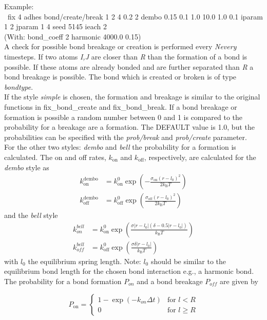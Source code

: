 \documentclass[a4paper,10pt]{scrreprt}
\begin{document}
Example:\\[0.5ex]
\
fix             4 adhes bond/create/break 1 2 4 0.2 2 dembo 0.15 0.1 1.0 10.0 1.0 0.1 iparam 1 2 jparam 1 4 seed 5145 ieach 2\\
(With: bond\_coeff      2 harmonic 4000.0 0.15)
\\[3ex]
A check for possible bond breakage or creation is performed every \textit{Nevery} timesteps. 
If two atoms \textit{I,J} are closer than \textit{R} than the formation of a bond is possible.
If these atoms are already bonded and are further separated than \textit{R} a bond breakage is possible.
The bond which is created or broken is of type \textit{bondtype}.
\\[2ex]
If the style \textit{simple} is chosen, the formation and breakage is similar to the original functions in fix\_bond\_create and fix\_bond\_break.
If a bond breakage or formation is possible a random number between 0 and 1 is compared to the probability for a breakage are a formation.
The DEFAULT value is 1.0, but the probabilities can be specified with the \textit{prob/break} and \textit{prob/create} parameter.
\\[2ex]
For the other two styles: \textit{dembo} and \textit{bell} the probability for a formation is calculated.
The on and off rates, $k_\mathrm{on}$ and $k_\mathrm{off}$, respectively, are calculated for the \textit{dembo} style as
\begin{align}
	k_\mathrm{on}^\mathrm{dembo} &= k_\mathrm{on}^0 \exp\left( -\frac{\sigma_\mathrm{on} (r - l_0)^2}{2 k_\mathrm{B} T}  \right)\\
  k_\mathrm{off}^\mathrm{dembo} &= k_\mathrm{off}^0 \exp\left( \frac{\sigma_\mathrm{off} (r - l_0)^2}{2 k_\mathrm{B} T}  \right)
\end{align}
and the \textit{bell} style
\begin{align}
	k_{on}^{bell} &= k_\mathrm{on}^0 \exp\left( \frac{ \sigma |r - l_0|(\delta - 0.5|r - l_0|) }{ k_\mathrm{B} T}  \right)\\
  k_{off}^{bell} &= k_\mathrm{off}^0 \exp\left( \frac{\sigma \delta |r - l_0|}{k_\mathrm{B} T}  \right)
\end{align}
with $l_0$ the equilibrium spring length.
Note: $l_0$ should be similar to the equilibrium bond length for the chosen bond interaction e.g., a harmonic bond.
\\[2ex]
The probability for a bond formation $P_{on}$ and a bond breakage $P_{off}$ are given by

\begin{equation}
P_\mathrm{on}  = 
\begin{cases}

1 - \exp(-k_{on}\Delta t) & \text{for } l < R\\
 0  & \text{for } l \ge R

\end{cases}
\end{equation}
\end{document}
